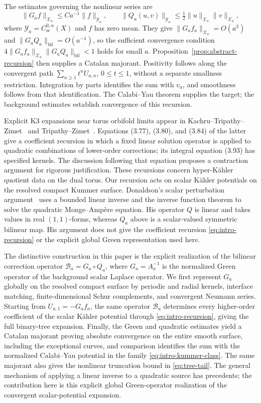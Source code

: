 \documentclass[11pt,a4paper,twoside]{article}
\numberwithin{equation}{section}
\theoremstyle{definition}
\theoremstyle{remark}
\begin{document}
The estimates governing the nonlinear series are
\[
\|G_af\|_{\mathcal X_a}\le Ca^{-1}\|f\|_{\mathcal Y_a},
\qquad \|Q_a(u,v)\|_{\mathcal Y_a}
\le\tfrac12\|u\|_{\mathcal X_a}\|v\|_{\mathcal X_a},
\]
where \(\mathcal Y_a=C_{\mathrm{sc}}^{0,\alpha}(X)\) and
\(f\) has zero mean. They give
\(\|G_af_a\|_{\mathcal X_a}=O(a^3)\) and
\(\|G_aQ_a\|_{\mathrm{bil}}=O(a^{-1})\), so the sufficient
convergence condition
\(4\|G_af_a\|_{\mathcal X_a}\|G_aQ_a\|_{\mathrm{bil}}<1\)
holds for small \(a\). Proposition~\ref{prop:abstract-recursion}
then supplies a Catalan majorant. Positivity follows along the
convergent path \(\sum_{n\ge1}t^nU_{a,n}\), \(0\le t\le1\),
without a separate smallness restriction. Integration by parts
identifies the sum with \(v_a\), and smoothness follows from
that identification. The Calabi--Yau theorem supplies the target;
the background estimates establish convergence of this recursion.

Explicit K3 expansions near torus orbifold limits appear in
Kachru--Tripathy--Zimet~\cite[Section~3.4]{KTZ2020} and
Tripathy--Zimet~\cite[Section~3.2]{TZ2020}.
Equations (3.77), (3.80), and (3.84) of the latter
give a coefficient recursion in which a fixed linear solution
operator is applied to quadratic combinations of lower-order
corrections; its integral
equation (3.93) has specified kernels. The discussion following
that equation proposes a contraction argument for rigorous
justification. These recursions concern hyper-K\"ahler quotient
data on the dual torus.
Our recursion acts on scalar K\"ahler potentials on the resolved
compact Kummer surface. Donaldson's scalar perturbation
argument~\cite[Sections~3.1--3.2]{DonaldsonKummer} uses a bounded
linear inverse and the inverse function theorem to solve the
quadratic Monge--Amp\`ere equation. His operator \(Q\) is linear
and takes values in real \((1,1)\)-forms, whereas \(Q_a\) above
is a scalar-valued symmetric bilinear map. His argument does not
give the coefficient recursion \eqref{eq:intro-recursion} or the
explicit global Green representation used here.

The distinctive construction in this paper is the explicit
realization of the bilinear correction operator
\(\mathcal B_a=G_a\circ Q_a\), where \(G_a=A_a^{-1}\) is the
normalized Green operator of the background scalar Laplace
operator. We first represent \(G_a\) globally on the resolved
compact surface by periodic and radial kernels, interface matching,
finite-dimensional Schur complements, and convergent Neumann
series. Starting from \(U_{a,1}=-G_af_a\), the same operator
\(\mathcal B_a\) determines every higher-order coefficient of
the scalar K\"ahler potential through
\eqref{eq:intro-recursion}, giving the full binary-tree expansion.
Finally, the Green and quadratic estimates yield a Catalan
majorant proving absolute convergence on the entire smooth
surface, including the exceptional curves, and comparison
identifies the sum with the normalized Calabi--Yau potential in
the family \eqref{eq:intro-kummer-class}. The same majorant also
gives the nonlinear truncation bound in \eqref{eq:tree-tail}.
The general mechanism of applying a linear inverse to a quadratic
source has precedents; the contribution here is this explicit
global Green-operator realization of the convergent scalar-potential
expansion.
\end{document}
